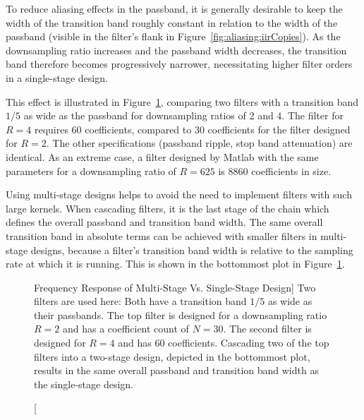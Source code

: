 To  reduce  aliasing  effects  in  the passband,  it  is  generally  desirable
to  keep  the width  of  the  transition  band  roughly constant  in  relation
to  the   width  of   the  passband   (visible  in   the  filter's   flank  in
Figure~\ref{fig:aliasing:iirCopies}).   As  the downsampling  ratio  increases
and  the  passband width  decreases,  the  transition band  therefore  becomes
progressively narrower,  necessitating higher filter orders  in a single-stage
design.

This   effect  is   illustrated  in   Figure~\ref{fig:fdesign:tbw_width_Rvar},
comparing two filters with a transition band $1/5$ as wide as the passband for
downsampling  ratios of  \num{2} and  \num{4}. The filter  for $R=4$  requires
\num{60}  coefficients,  compared  to  \num{30} coefficients  for  the  filter
designed  for $R=2$.   The other  specifications (passband  ripple, stop  band
attenuation) are identical.   As an extreme case, a filter  designed by Matlab
with the  same parameters for  a downsampling  ratio of $R=625$  is \num{8860}
coefficients in size.

Using multi-stage  designs helps to avoid  the need to implement  filters with
such large  kernels.  When  cascading filters,  it is the  last stage  of  the
chain which defines  the overall passband and transition  band width. The same
overall transition band in absolute terms can be achieved with smaller filters
in multi-stage designs,  because a filter's transition band  width is relative
to the sampling rate at which it  is running.  This is shown in the bottommost
plot in Figure~\ref{fig:fdesign:tbw_width_Rvar}. 

\begin{figure}
    \centering
    
    \caption
        [Frequency Response of Multi-Stage Vs. Single-Stage Design]{%
        Two filters are  used here: Both have a transition band  $1/5$ as wide
        as  their passbands. The  top filter  is designed  for a  downsampling
        ratio $R=2$ and  has a coefficient count of  $N=30$. The second filter
        is designed for $R=4$ and  has \num{60} coefficients. Cascading two of
        the top  filters into a  two-stage design, depicted in  the bottommost
        plot, results in  the same overall passband and  transition band width
        as the single-stage design.%
    }
    \label{fig:fdesign:tbw_width_Rvar}
\end{figure}

